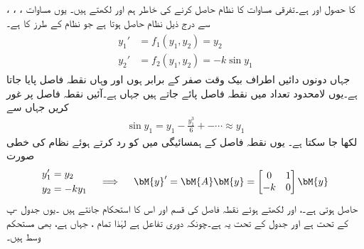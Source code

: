   ، ، ،  کا حصول  اور  ہے۔تفرقی مساوات کا نظام حاصل کرنے کی خاطر ہم  اور  لکھتے ہیں۔ یوں مساوات  سے درج ذیل نظام حاصل ہوتا ہے جو  نظام  کے طرز کا ہے۔
\begin{gather}\label{مساوات_نظام_غیر_خطی_ترکیب_مرحلہ_ٹ}
\begin{aligned}
y_1'&=f_1(y_1,y_2)=y_2\\
y_2'&=f_2(y_1,y_2)=-k\sin y_1
\end{aligned}
\end{gather}
جہاں دونوں دائیں اطراف بیک وقت صفر کے برابر ہوں  اور  وہاں نقطہ فاصل پایا جاتا ہے۔یوں لامحدود تعداد میں نقطہ فاصل  پائے جاتے ہیں جہاں  ہے۔آئیں نقطہ فاصل  پر غور کریں جہاں  سے
\begin{align*}
\sin y_1=y_1-\frac{y_1^3}{6}+-\cdots \approx y_1
\end{align*}
لکھا جا سکتا ہے۔ یوں نقطہ فاصل کے ہمسائیگی میں  کو رد کرتے ہوئے  نظام  کی خطی صورت
\begin{gather}
\begin{aligned}
y_1'&=y_2\\
y_2&=-ky_1
\end{aligned}\quad \implies \quad
\begin{aligned}
\bM{y}'=\bM{A} \bM{y}=\begin{bmatrix} 0&1\\-k&0 \end{bmatrix}\bM{y}
\end{aligned}
\end{gather}
حاصل ہوتی ہے۔،  اور  لکھتے ہوئے نقطہ فاصل کی قسم اور اس کا استحکام جانتے ہیں ۔یوں جدول -پ کے تحت   ہے اور جدول  کے تحت یہ   ہے۔چونکہ  دوری تفاعل ہے لہٰذا تمام ، جہاں  ہے،  بھی مستحکم وسط ہیں۔ 
 
